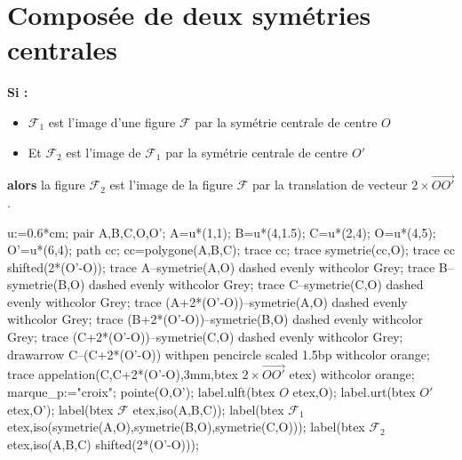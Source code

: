\section{Composée de deux symétries centrales}
\begin{propriete}[\admise]
    {\bfseries Si : }
    \begin{itemize}
        \item ${\mathcal F}_1$ est l'image d'une figure $\mathcal F$ par la symétrie centrale de centre $O$
        \item Et ${\mathcal F}_2$ est l'image de ${\mathcal F}_1$ par la symétrie centrale de centre $O'$
    \end{itemize}
    {\bfseries alors} la figure ${\mathcal F}_2$ est l'image de la figure $\mathcal F$ par la translation de vecteur $2\times\overrightarrow{OO'}$.

    \smallskip
    \begin{center}
        \begin{Geometrie}[CoinBG={(0,-u)},CoinHD={(10u,10u)}]
            u:=0.6*cm;
            pair A,B,C,O,O';
            A=u*(1,1);
            B=u*(4,1.5);
            C=u*(2,4);
            O=u*(4,5);
            O'=u*(6,4);
            path cc;        
            cc=polygone(A,B,C);
            trace cc;
            trace symetrie(cc,O);
            trace cc shifted(2*(O'-O));
            trace A--symetrie(A,O) dashed evenly withcolor Grey;
            trace B--symetrie(B,O) dashed evenly withcolor Grey;
            trace C--symetrie(C,O) dashed evenly withcolor Grey;
            trace (A+2*(O'-O))--symetrie(A,O) dashed evenly withcolor Grey;
            trace (B+2*(O'-O))--symetrie(B,O) dashed evenly withcolor Grey;
            trace (C+2*(O'-O))--symetrie(C,O) dashed evenly withcolor Grey;
            drawarrow C--(C+2*(O'-O)) withpen pencircle scaled 1.5bp withcolor orange;
            trace appelation(C,C+2*(O'-O),3mm,btex $2\times\overrightarrow{OO'}$ etex) withcolor orange;
            marque_p:="croix";
            pointe(O,O');
            label.ulft(btex $O$ etex,O);
            label.urt(btex $O'$ etex,O');
            label(btex $\mathcal F$ etex,iso(A,B,C));
            label(btex ${\mathcal F}_1$ etex,iso(symetrie(A,O),symetrie(B,O),symetrie(C,O)));
            label(btex ${\mathcal F}_2$ etex,iso(A,B,C) shifted(2*(O'-O)));
        \end{Geometrie}
    \end{center}
\end{propriete}